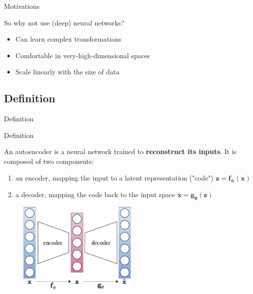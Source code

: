 \documentclass[handout]{beamer}
\begin{document}
  \begin{frame}{Motivations}
    

    \begin{block}{So why not use (deep) neural networks?}
      \begin{itemize}
        \item Can learn complex transformations
        \item Comfortable in very-high-dimensional spaces
        \item Scale linearly with the size of data
      \end{itemize}
    \end{block}
    
  \end{frame}

  \subsection{Definition}

  \begin{frame}{Definition}


    \begin{exampleblock}{Definition}
      \small{
      An \alert{autoencoder} is a neural network trained to \textbf{reconstruct its inputs}. It is composed of two components:
      \vspace{-0.4cm}
      \begin{enumerate}
        \item an \alert{encoder}, mapping the input to a latent representation ("code") $\mathbf{z} = \mathbf{f}_{\boldsymbol{\phi}}(\mathbf{x})$
        \item a \alert{decoder}, mapping the code back to the input space $\tilde{\mathbf{x}} = \mathbf{g}_{\boldsymbol{\theta}}(\mathbf{z})$
      \end{enumerate}
      }
    \end{exampleblock}
    \vspace{-0.25cm}
    \begin{figure}
      \includegraphics[height=4.5cm]{rc/autoencoder}
    \end{figure}

  \end{frame}
\end{document}
